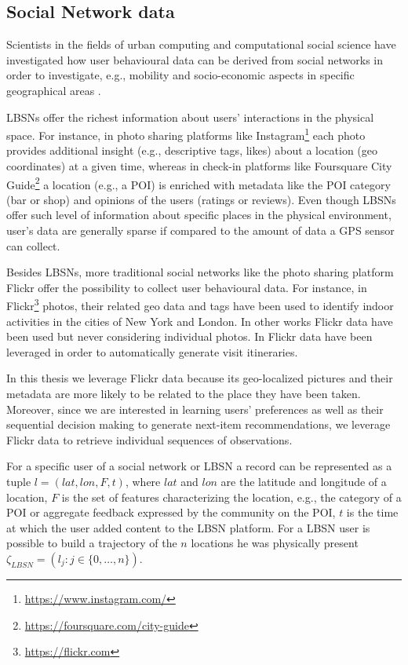 \subsection{Social Network data}
Scientists in the fields of urban computing and computational social science have investigated how user behavioural data can be derived from social networks in order to investigate, e.g., mobility and socio-economic aspects in specific geographical areas \cite{urban_computing:2014, urban_computing:LBSN:2019,eating_habits:lbsn:2014}.

LBSNs offer the richest information about users' interactions in the physical space.
For instance, in photo sharing platforms like Instagram\footnote{\url{https://www.instagram.com/}} each photo provides additional insight (e.g., descriptive tags, likes) about a location (geo coordinates) at a given time, whereas in check-in platforms like Foursquare City Guide\footnote{\url{https://foursquare.com/city-guide}} a location (e.g., a POI) is enriched with metadata like the POI category (bar or shop) and opinions of the users (ratings or reviews).
Even though LBSNs offer such level of information about specific places in the physical environment, user's data are generally sparse if compared to the amount of data a GPS sensor can collect. %

Besides LBSNs, more traditional social networks like the photo sharing platform Flickr offer the possibility to collect user behavioural data. For instance, in \cite{indoor:lbsn:2018} Flickr\footnote{\url{https://flickr.com}} photos, their related geo data and tags have been used to identify indoor activities in the cities of New York and London. In other works \cite{danub:lbsn:2019} Flickr data have been used but never considering individual photos.
In \cite{lbsn:itineraries:2010} Flickr data have been leveraged in order to automatically generate visit itineraries. 

In this thesis we leverage Flickr data because its geo-localized pictures and their metadata are more likely to be related to the place they have been taken. Moreover, since we are interested in learning users' preferences as well as their sequential decision making to generate next-item recommendations, we leverage Flickr data to retrieve individual sequences of observations.

For a specific user of a social network or LBSN a record can be represented as a tuple $l = (lat, lon, F, t)$, where $lat$ and $lon$ are the latitude and longitude of a location, $F$ is the set of features characterizing the location, e.g., the category of a POI or aggregate feedback expressed by the community on the POI, $t$ is the time at which the user added content to the LBSN platform.
For a LBSN user is possible to build a trajectory of the $n$ locations he was physically present %
$\zeta_{LBSN} = (l_j: j \in \{ 0, \dots, n\})$.


